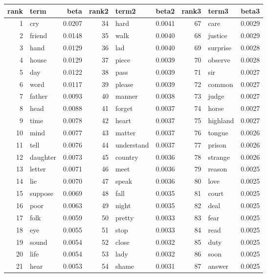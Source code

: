 \begin{table}[ht]
\centering
\begin{tabular}{rlrrlrrlr}
  \hline
rank & term & beta & rank2 & term2 & beta2 & rank3 & term3 & beta3 \\ 
  \hline
1 & cry & 0.0207 & 34 & hard & 0.0041 & 67 & care & 0.0029 \\ 
  2 & friend & 0.0148 & 35 & walk & 0.0040 & 68 & justice & 0.0029 \\ 
  3 & hand & 0.0129 & 36 & lad & 0.0040 & 69 & surprise & 0.0028 \\ 
  4 & house & 0.0129 & 37 & piece & 0.0039 & 70 & observe & 0.0028 \\ 
  5 & day & 0.0122 & 38 & pass & 0.0039 & 71 & sir & 0.0027 \\ 
  6 & word & 0.0117 & 39 & please & 0.0039 & 72 & common & 0.0027 \\ 
  7 & father & 0.0093 & 40 & manner & 0.0038 & 73 & judge & 0.0027 \\ 
  8 & head & 0.0088 & 41 & forget & 0.0037 & 74 & horse & 0.0027 \\ 
  9 & time & 0.0078 & 42 & heart & 0.0037 & 75 & highland & 0.0027 \\ 
  10 & mind & 0.0077 & 43 & matter & 0.0037 & 76 & tongue & 0.0026 \\ 
  11 & tell & 0.0076 & 44 & understand & 0.0037 & 77 & prison & 0.0026 \\ 
  12 & daughter & 0.0073 & 45 & country & 0.0036 & 78 & strange & 0.0026 \\ 
  13 & letter & 0.0071 & 46 & meet & 0.0036 & 79 & reason & 0.0025 \\ 
  14 & lie & 0.0070 & 47 & speak & 0.0036 & 80 & love & 0.0025 \\ 
  15 & suppose & 0.0069 & 48 & fall & 0.0035 & 81 & court & 0.0025 \\ 
  16 & poor & 0.0063 & 49 & night & 0.0035 & 82 & deal & 0.0025 \\ 
  17 & folk & 0.0059 & 50 & pretty & 0.0033 & 83 & fear & 0.0025 \\ 
  18 & eye & 0.0055 & 51 & stop & 0.0033 & 84 & read & 0.0025 \\ 
  19 & sound & 0.0054 & 52 & close & 0.0032 & 85 & duty & 0.0025 \\ 
  20 & life & 0.0054 & 53 & lady & 0.0032 & 86 & soon & 0.0025 \\ 
  21 & hear & 0.0053 & 54 & shame & 0.0031 & 87 & answer & 0.0025 \\ 

\end{tabular}
\end{table}
